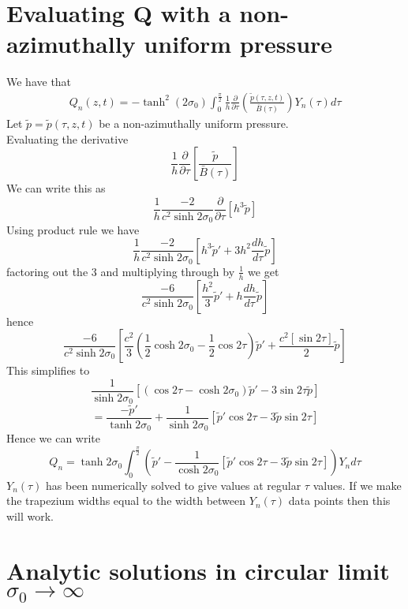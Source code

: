 \documentclass[12pt]{article}
\begin{document}
\section{Evaluating Q with a non-azimuthally uniform pressure}
We have that
\begin{align*}
Q_n(z,t)=-\tanh^2(2\sigma_0)\int_0^{\frac{\pi}{2}}\frac{1}{h}\frac{\partial}{\partial \tau}\left(\frac{\tilde{p}(\tau,z,t)}{\bar{B}(\tau)}\right)Y_n(\tau)d\tau
\end{align*}
Let $\tilde{p}=\tilde{p}(\tau,z,t)$ be a non-azimuthally uniform pressure.
\\ Evaluating the derivative $$\frac{1}{h}\frac{\partial}{\partial \tau}\left[\frac{\tilde{p}}{\bar{B}(\tau)}\right]$$
We can write this as $$\frac{1}{h}\frac{-2}{c^2\sinh 2\sigma_0}\frac{\partial}{\partial \tau}\left[h^3 \tilde{p}\right]$$
Using product rule we have $$\frac{1}{h}\frac{-2}{c^2\sinh 2\sigma_0}\left[h^3 \tilde{p}'+3h^2\frac{dh}{d\tau}\tilde{p}\right]$$ factoring out the 3 and multiplying through by $\frac{1}{h}$ we get $$\frac{-6}{c^2\sinh 2\sigma_0}\left[\frac{h^2}{3} \tilde{p}'+h\frac{dh}{d\tau}\tilde{p}\right]$$ hence $$\frac{-6}{c^2\sinh 2\sigma_0}\left[\frac{c^2}{3}(\frac{1}{2}\cosh 2\sigma_0-\frac{1}{2}\cos 2\tau)\tilde{p}'+\frac{c^2[\sin 2\tau]}{2}\tilde{p}\right]$$ 
This simplifies to $$\frac{1}{\sinh 2\sigma_0}\left[(\cos 2\tau - \cosh 2\sigma_0)\tilde{p}'-3\sin 2\tau \tilde{p}\right]$$
$$=\frac{-\tilde{p}'}{\tanh 2\sigma_0}+\frac{1}{\sinh 2\sigma_0}\left[\tilde{p}'\cos 2\tau - 3\tilde{p}\sin 2\tau\right]$$
Hence we can write $$Q_n=\tanh 2\sigma_0 \int_0^{\frac{\pi}{2}} \left(\tilde{p}'-\frac{1}{\cosh 2\sigma_0}\left[\tilde{p}'\cos 2\tau - 3\tilde{p}\sin 2\tau\right]\right) Y_n d\tau$$ $Y_n(\tau)$ has been numerically solved to give values at regular $\tau$ values. If we make the trapezium widths equal to the width between $Y_n(\tau)$ data points then this will work.


\section{Analytic solutions in circular limit $\sigma_0 \rightarrow \infty$}
\end{document}
